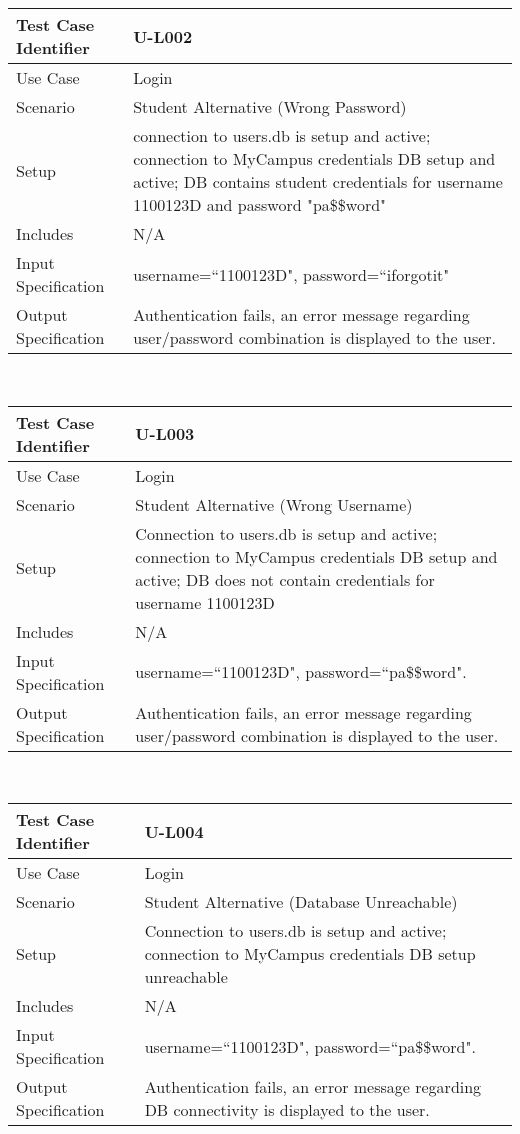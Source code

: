 \documentclass{l3deliverable}
\begin{document}
\begin{tabular}{lp{10cm}}
\hline 
\textbf{Test Case Identifier} & U-L002 \tabularnewline
\hline 
\hline 
Use Case & Login \tabularnewline
\hline 
Scenario & Student Alternative (Wrong Password) \tabularnewline
\hline 
Setup & connection to users.db is setup and active; connection to MyCampus credentials DB setup and active; DB contains student credentials for username 1100123D and password "pa\$\$word" \tabularnewline
\hline 
Includes & N/A \tabularnewline
\hline 
Input Specification & username=``1100123D", password=``iforgotit" \tabularnewline
\hline 
Output Specification & Authentication fails, an error message regarding user/password combination is displayed to the user.\tabularnewline
\hline 
\end{tabular}\\



\begin{tabular}{lp{10cm}}
\hline 
\textbf{Test Case Identifier} & U-L003\tabularnewline
\hline 
\hline 
Use Case & Login \tabularnewline
\hline 
Scenario & Student Alternative (Wrong Username) \tabularnewline
\hline 
Setup & Connection to users.db is setup and active; connection to MyCampus credentials DB setup and active; DB does not contain credentials for username 1100123D  \tabularnewline
\hline 
Includes & N/A \tabularnewline
\hline 
Input Specification & username=``1100123D", password=``pa\$\$word".\tabularnewline
\hline 
Output Specification & Authentication fails, an error message regarding user/password combination is displayed to the user.\tabularnewline
\hline 
\end{tabular}\\


\begin{tabular}{lp{10cm}}
\hline 
\textbf{Test Case Identifier} & U-L004\tabularnewline
\hline 
\hline 
Use Case & Login \tabularnewline
\hline 
Scenario & Student Alternative (Database Unreachable) \tabularnewline
\hline 
Setup & Connection to users.db is setup and active; connection to MyCampus credentials DB setup unreachable \tabularnewline
\hline 
Includes & N/A \tabularnewline
\hline 
Input Specification & username=``1100123D", password=``pa\$\$word".\tabularnewline
\hline 
Output Specification & Authentication fails, an error message regarding DB connectivity is displayed to the user.\tabularnewline
\hline 
\end{tabular}\\
\end{document}
